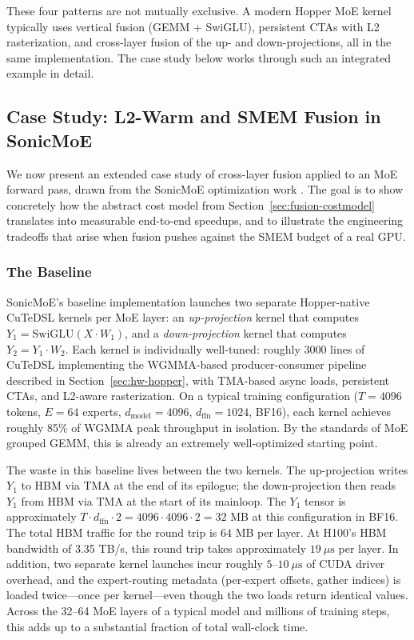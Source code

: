 \documentclass[10pt]{article}
\begin{document}
These four patterns are not mutually exclusive. A modern Hopper MoE kernel typically uses vertical fusion (GEMM + SwiGLU), persistent CTAs with L2 rasterization, and cross-layer fusion of the up- and down-projections, all in the same implementation. The case study below works through such an integrated example in detail.

\subsection{Case Study: L2-Warm and SMEM Fusion in SonicMoE}
\label{sec:fusion-case}

We now present an extended case study of cross-layer fusion applied to an MoE forward pass, drawn from the SonicMoE optimization work \citep{sonicmoe2025}. The goal is to show concretely how the abstract cost model from Section~\ref{sec:fusion-costmodel} translates into measurable end-to-end speedups, and to illustrate the engineering tradeoffs that arise when fusion pushes against the SMEM budget of a real GPU.

\subsubsection{The Baseline}
SonicMoE's baseline implementation launches two separate Hopper-native CuTeDSL kernels per MoE layer: an \emph{up-projection} kernel that computes $Y_1 = \mathrm{SwiGLU}(X \cdot W_1)$, and a \emph{down-projection} kernel that computes $Y_2 = Y_1 \cdot W_2$. Each kernel is individually well-tuned: roughly 3000 lines of CuTeDSL implementing the WGMMA-based producer-consumer pipeline described in Section~\ref{sec:hw-hopper}, with TMA-based async loads, persistent CTAs, and L2-aware rasterization. On a typical training configuration ($T = 4096$ tokens, $E = 64$ experts, $d_{\text{model}} = 4096$, $d_{\text{ffn}} = 1024$, BF16), each kernel achieves roughly 85\% of WGMMA peak throughput in isolation. By the standards of MoE grouped GEMM, this is already an extremely well-optimized starting point.

The waste in this baseline lives between the two kernels. The up-projection writes $Y_1$ to HBM via TMA at the end of its epilogue; the down-projection then reads $Y_1$ from HBM via TMA at the start of its mainloop. The $Y_1$ tensor is approximately $T \cdot d_{\text{ffn}} \cdot 2 = 4096 \cdot 4096 \cdot 2 = 32$ MB at this configuration in BF16. The total HBM traffic for the round trip is $64$ MB per layer. At H100's HBM bandwidth of 3.35 TB/s, this round trip takes approximately $19~\mu\text{s}$ per layer. In addition, two separate kernel launches incur roughly $5\text{--}10~\mu\text{s}$ of CUDA driver overhead, and the expert-routing metadata (per-expert offsets, gather indices) is loaded twice---once per kernel---even though the two loads return identical values. Across the 32--64 MoE layers of a typical model and millions of training steps, this adds up to a substantial fraction of total wall-clock time.
\end{document}
